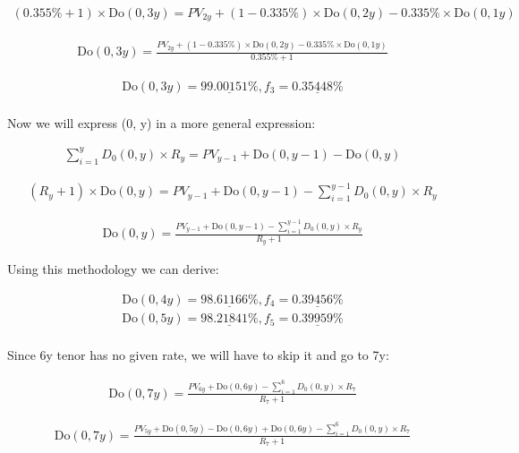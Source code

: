 \documentclass[12pt]{article}
\begin{document}
\begin{gather*}
\left(0.355\%+1\right) \times \text{Do}(0, 3y) = PV_{2y}^{} + \left(1-0.335\%\right) \times \text{Do}(0, 2y) - 0.335\% \times \text{Do}(0, 1y)
\end{gather*}

\begin{gather*}
\text{Do}(0, 3y) = \frac{PV_{2y}^{} + \left(1-0.335\%\right) \times \text{Do}(0, 2y) - 0.335\% \times \text{Do}(0, 1y)}{0.355\%+1}
\end{gather*}

\begin{gather*}
\text{Do}(0, 3y) = \underline{
99.00151\%} , f_3 = \underline{0.35448\%}\\
\end{gather*}

\noindent Now we will express (0, y) in a more general expression:

\begin{gather*}
\sum_{i=1}^{y} D_0(0, y) \times R_y
= PV_{y-1}^{} + \text{Do}(0, y-1) - \text{Do}(0, y)
\end{gather*}

\begin{gather*}
\left(R_y + 1\right) \times \text{Do}(0, y) = PV_{y-1}^{} + \text{Do}(0, y-1) - \sum_{i=1}^{y-1} D_0(0, y) \times R_y
\end{gather*}

\begin{gather*}
\text{Do}(0, y) = \frac{PV_{y-1}^{} + \text{Do}(0, y-1) - \sum_{i=1}^{y-1} D_0(0, y) \times R_y}{R_y + 1}
\end{gather*}

\noindent Using this methodology we can derive:

\begin{gather*}
\text{Do}(0, 4y) = \underline{
98.61166\%} , f_4 = \underline{0.39456\%}\\
\text{Do}(0, 5y) = \underline{
98.21841\%} , f_5 = \underline{0.39959\%}\\
\end{gather*}

\noindent Since 6y tenor has no given rate, we will have to skip it and go to 7y:

\begin{gather*}
\text{Do}(0, 7y) = \frac{PV_{6y}^{} + \text{Do}(0, 6y) - \sum_{i=1}^{6} D_0(0, y) \times R_7}{R_7 + 1}
\end{gather*}

\begin{gather*}
\text{Do}(0, 7y) = \frac{PV_{5y}^{} + \text{Do}(0, 5y) - \text{Do}(0, 6y) + \text{Do}(0, 6y) - \sum_{i=1}^{6} D_0(0, y) \times R_7}{R_7 + 1}
\end{gather*}
\end{document}
